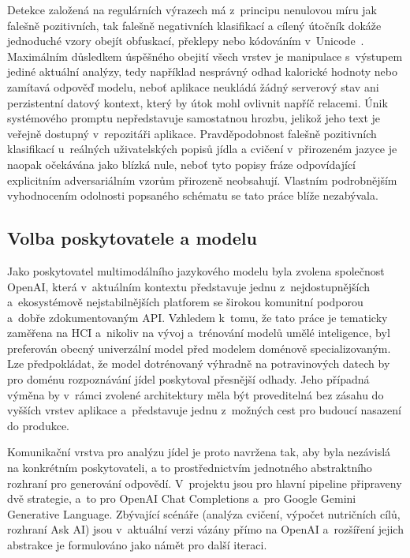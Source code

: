 Detekce založená na regulárních výrazech má z~principu nenulovou míru jak falešně pozitivních, tak falešně negativních klasifikací a cílený útočník dokáže jednoduché vzory obejít obfuskací, překlepy nebo kódováním v~Unicode~\cite{liu2024formalizing}.
Maximálním důsledkem úspěšného obejití všech vrstev je manipulace s~výstupem jediné aktuální analýzy, tedy například nesprávný odhad kalorické hodnoty nebo zamítavá odpověď modelu, neboť aplikace neukládá žádný serverový stav ani perzistentní datový kontext, který by útok mohl ovlivnit napříč relacemi.
Únik systémového promptu nepředstavuje samostatnou hrozbu, jelikož jeho text je veřejně dostupný v~repozitáři aplikace.
Pravděpodobnost falešně pozitivních klasifikací u~reálných uživatelských popisů jídla a cvičení v~přirozeném jazyce je naopak očekávána jako blízká nule, neboť tyto popisy fráze odpovídající explicitním adversariálním vzorům přirozeně neobsahují.
Vlastním podrobnějším vyhodnocením odolnosti popsaného schématu se tato práce blíže nezabývala.

\subsection{Volba poskytovatele a modelu}
\label{subsec:vicePoskytovatelu}

Jako poskytovatel multimodálního jazykového modelu byla zvolena společnost OpenAI, která v~aktuálním kontextu představuje jednu z~nejdostupnějších a~ekosystémově nejstabilnějších platforem se širokou komunitní podporou a~dobře zdokumentovaným API.
Vzhledem k~tomu, že tato práce je tematicky zaměřena na HCI a~nikoliv na vývoj a~trénování modelů umělé inteligence, byl preferován obecný univerzální model před modelem doménově specializovaným.
Lze předpokládat, že model dotrénovaný výhradně na potravinových datech by pro doménu rozpoznávání jídel poskytoval přesnější odhady.
Jeho případná výměna by v~rámci zvolené architektury měla být proveditelná bez zásahu do vyšších vrstev aplikace a~představuje jednu z~možných cest pro budoucí nasazení do produkce.

Komunikační vrstva pro analýzu jídel je proto navržena tak, aby byla nezávislá na konkrétním poskytovateli, a to prostřednictvím jednotného abstraktního rozhraní pro generování odpovědí.
V~projektu jsou pro hlavní pipeline připraveny dvě strategie, a~to pro OpenAI Chat Completions a~pro Google Gemini Generative Language.
Zbývající scénáře (analýza cvičení, výpočet nutričních cílů, rozhraní Ask AI) jsou v~aktuální verzi vázány přímo na OpenAI a~rozšíření jejich abstrakce je formulováno jako námět pro další iteraci.

